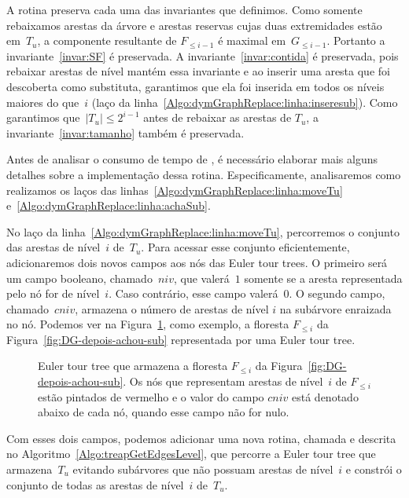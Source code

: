A rotina \dymGraphReplace{} preserva cada uma das invariantes que definimos. 
Como somente rebaixamos arestas da árvore e arestas reservas cujas duas extremidades estão em~$T_u$, a componente resultante de $F_{\leqslant i-1}$ é maximal em~$G_{\leqslant i-1}$. Portanto a invariante~\ref{invar:SF} é preservada.
A invariante~\ref{invar:contida} é preservada, pois rebaixar arestas de nível mantém essa invariante e ao inserir uma aresta que foi descoberta como substituta, garantimos que ela foi inserida em todos os níveis maiores do que~$i$ (laço da linha~\ref{Algo:dymGraphReplace:linha:inseresub}).  
Como garantimos que~$|T_u| \leqslant 2^{i-1}$ antes de rebaixar as arestas de $T_u$, a invariante~\ref{invar:tamanho} também é preservada.

Antes de analisar o consumo de tempo de \dymGraphReplace{}, é necessário elaborar mais alguns detalhes sobre a implementação dessa rotina.
Especificamente, analisaremos como realizamos os laços das linhas~\ref{Algo:dymGraphReplace:linha:moveTu} e~\ref{Algo:dymGraphReplace:linha:achaSub}.

No laço da linha~\ref{Algo:dymGraphReplace:linha:moveTu}, percorremos o conjunto das arestas de nível~$i$ de~$T_u$. Para acessar esse conjunto eficientemente, adicionaremos dois novos campos aos nós das Euler tour trees. O primeiro será um campo booleano, chamado~$niv$, que valerá~$1$ somente se a aresta representada pelo nó for de nível~$i$. Caso contrário, esse campo valerá~$0$. O segundo campo, chamado~$cniv$, armazena o número de arestas de nível $i$ na subárvore enraizada no nó. Podemos ver na Figura~\ref{fig:DG-TREAP-niv}, como exemplo, a floresta $F_{\leqslant i}$ da Figura~\ref{fig:DG-depois-achou-sub} representada por uma Euler tour tree.

\begin{figure}[htb]
\scalebox{.61}{
\centering
}
\caption{Euler tour tree que armazena a floresta $F_{\leqslant i}$ da Figura~\ref{fig:DG-depois-achou-sub}. Os nós que representam arestas de nível~$i$ de $F_{\leqslant i}$ estão pintados de vermelho e o valor do campo $cniv$ está denotado abaixo de cada nó, quando esse campo não for nulo.}
\label{fig:DG-TREAP-niv}
\end{figure}

Com esses dois campos, podemos adicionar uma nova rotina, chamada \treapGetEdgesLevel{} e descrita no Algoritmo~\ref{Algo:treapGetEdgesLevel}, que percorre a Euler tour tree que armazena~$T_u$ evitando subárvores que não possuam arestas de nível~$i$ e constrói o conjunto de todas as arestas de nível~$i$ de~$T_u$.

